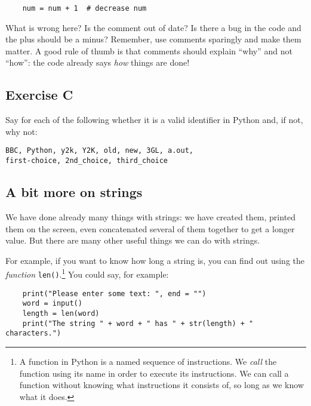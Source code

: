 \begin{verbatim}
    num = num + 1  # decrease num
\end{verbatim}

What is wrong here? Is the comment out of date? Is there a bug in the
code and the plus should be a minus? Remember, use comments sparingly
and make them matter. A good rule of thumb is that comments should
explain ``why'' and not ``how'': the code already says \emph{how}
things are done! 

\subsection*{Exercise C}

Say for each of the following whether it is a valid identifier
in Python and, if not, why not:
\begin{Verbatim}
BBC, Python, y2k, Y2K, old, new, 3GL, a.out, 
first-choice, 2nd_choice, third_choice
\end{Verbatim}

\subsection{A bit more on strings}

We have done already many things with strings: we have
created them, printed them on the screen, even concatenated several of
them together to get a longer value. But there are many other useful
things we can do with strings.

For example, if you want to know how long a string is, you can find
out using the \emph{function} \verb!len()!.\footnote{A function
in Python is a named sequence of instructions. We 
\emph{call} the function using its name in order to execute its instructions.
We can call a function without knowing what instructions it consists of, so
long as we know what it does.}
You could say, for example:

\begin{Verbatim}
    print("Please enter some text: ", end = "")
    word = input()
    length = len(word)
    print("The string " + word + " has " + str(length) + " characters.")
\end{Verbatim}

